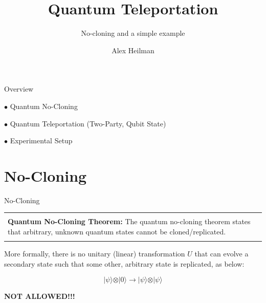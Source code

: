\documentclass[11pt]{beamer}
\author{Alex Heilman}
\title{Quantum Teleportation}
\subtitle{No-cloning and a simple example}
\newenvironment{boxed2}
    {\begin{center}
    \begin{tabular}{|p{0.95\textwidth}|}
    \hline\\
    }
    { 
    \\\\\hline
    \end{tabular} 
    \end{center}
    }
\begin{document}
\begin{frame}
\titlepage
\end{frame}


\begin{frame}{Overview}

$\bullet$ Quantum No-Cloning

\vspace{1cm}\pause

$\bullet$ Quantum Teleportation \pause (Two-Party, Qubit State) 

\vspace{1cm}\pause

$\bullet$ Experimental Setup


\end{frame}

\section{No-Cloning}
\begin{frame}{No-Cloning}

\begin{boxed2}
\textbf{Quantum No-Cloning Theorem:} The quantum no-cloning theorem states that arbitrary, unknown quantum states cannot be cloned/replicated.
\end{boxed2}\pause

More formally, there is no unitary (linear) transformation $U$ that can evolve a secondary state such that some other, arbitrary state is replicated, as below:

$$
\vert \psi\rangle \otimes \vert 0\rangle \rightarrow\vert \psi\rangle \otimes \vert \psi \rangle  
$$ \pause
\begin{center}
\textbf{NOT ALLOWED!!!}
\end{center}
\end{frame}
\end{document}
